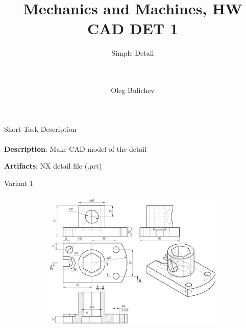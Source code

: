 \documentclass[aspectratio=169]{beamer}
\title[MaM]{Mechanics and Machines, HW CAD DET 1} %
\subtitle{Simple Detail 
\\ \  \\ \ 
         } %
\author{Oleg Bulichev}
\newcommand{\fbckg}[1]{\usebackgroundtemplate{\texttt{[image: \#1]}}}%
\begin{document}
\setlength{\abovedisplayskip}{0pt}
\setlength{\belowdisplayskip}{0pt}
\setlength{\abovedisplayshortskip}{0pt}
\setlength{\belowdisplayshortskip}{0pt}

\fbckg{fibeamer/figs/title_page.png}

\fbckg{fibeamer/figs/common.png}

\note{\scriptsize \begin{itemize}
        \item \
    \end{itemize}}

\note{
    \
}

\begin{frame}[t]{Short Task Description}
    \framesubtitle{}
    \LARGE
    \textbf{Description}: Make CAD model of the detail

    \textbf{Artifacts}: NX detail file (.prt)
\end{frame}

\begin{frame}[t]{Variant 1}
    \framesubtitle{}
    \vspace{-0.5cm}
    \begin{figure}[H]
        \centering\includegraphics[height=6.5cm,width=1\textwidth,keepaspectratio]{1.png}
        \label{fig:1.png}
    \end{figure}
\end{frame}
\end{document}
